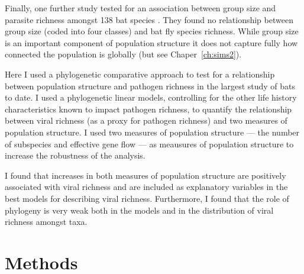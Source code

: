 Finally, one further study tested for an association between group size and parasite richness amongst 138 bat species \cite{bordes2008bat}.
They found no relationship between group size (coded into four classes) and bat fly species richness.
While group size is an important component of population structure it does not capture fully how connected the population is globally (but see Chaper~\ref{ch:sims2}). 





Here I used a phylogenetic comparative approach to test for a relationship between population structure and pathogen richness in the largest study of bats to date. 
I used a phylogenetic linear models, controlling for the other life history characteristics known to impact pathogen richness, to quantify the relationship between viral richness (as a proxy for pathogen richness) and two measures of population structure. 
I used two measures of population structure --- the number of subspecies and effective gene flow --- as meausures of population structure to increase the robustness of the analysis.

I found that increases in both measures of population structure are positively associated with viral richness and are included as explanatory variables in the best models for describing viral richness.
Furthermore, I found that the role of phylogeny is very weak both in the models and in the distribution of viral richness amongst taxa.



\section{Methods}

